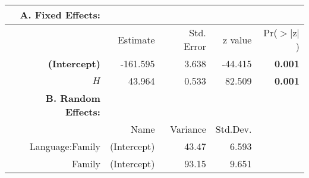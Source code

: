 \begin{tabular}{rrrrr}
 {\bf A. Fixed Effects:} \\
\hline
 & Estimate & Std. Error & z value & Pr($>$$|$z$|$) \\ 
  \hline
{\bf (Intercept)} & -161.595 & 3.638 & -44.415 & {\bf 0.001} \\ 
 {\bf $H$} & 43.964 & 0.533 & 82.509 & {\bf 0.001} \\ 

\hline \hline
{\bf B. Random Effects:} \\
\hline
& Name & Variance & Std.Dev. \\
\hline
Language:Family & (Intercept) & 43.47 & 6.593 \\
Family & (Intercept) & 93.15 & 9.651 \\
\end{tabular}
